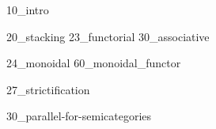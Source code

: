 

\label{chap:parallelism}
{10_intro}

{20_stacking}
{23_functorial}
{30_associative}

{24_monoidal}
{60_monoidal_functor}

{27_strictification}

{30_parallel-for-semicategories}



